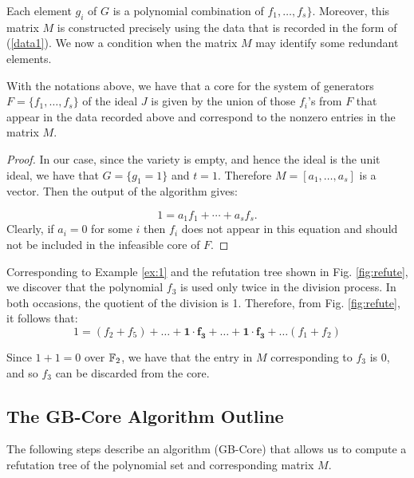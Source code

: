 Each element $g_i$ of $G$ is a polynomial combination of $f_1, \dots,
f_s\}$. Moreover, this matrix $M$ is constructed precisely using the
data that is recorded in the form of (\ref{data1}). We now a condition
when the matrix $M$ may identify some redundant elements. 


\begin{theorem}
\label{thm}
With the notations above, we have that a core for the system of
generators $F = \{f_1,\dots,f_s\}$ of the ideal $J$ is given by the
union of those $f_i$'s from $F$ that appear in the data recorded above
and correspond to the nonzero entries in the matrix $M$.  
\end{theorem}

\begin{proof}
In our case, since the variety is empty, and hence the ideal is the
unit ideal, we have that $G = \{g_1=1\}$ and $t=1$. Therefore $M=
[a_1, \ldots, a_s]$ is a vector. Then the output of the algorithm
gives:

$$1 = a_1f_1+\cdots + a_s f_s.$$ Clearly, if $a_i=0$ for some $i$ then
$f_i$ does not appear in this equation and should not be included in
the infeasible core of $F$. 

\end{proof}


\begin{example}

Corresponding to Example \ref{ex:1} and the refutation tree shown in
Fig. \ref{fig:refute}, we discover that the polynomial $f_3$ is used
only twice in the division process. In both occasions, the quotient of
the division is 1. Therefore, from Fig. \ref{fig:refute}, it follows that:
\begin{equation}
1 = (f_2 + f_5) + \dots + \mathbf{1\cdot f_3} + \dots + \mathbf{1\cdot f_3}+ \dots (f_1
+ f_2)
\end{equation}

Since $1 + 1 = 0$ over ${\mathbb{F}}_2$, we have that the entry in $M$
corresponding to $f_3$ is 0, and so $f_3$ can be discarded from the
core. 
\end{example}

\subsection{The GB-Core Algorithm Outline}

The following steps describe an algorithm (GB-Core) that allows us to compute a
refutation tree of the polynomial set and corresponding matrix $M$. 

